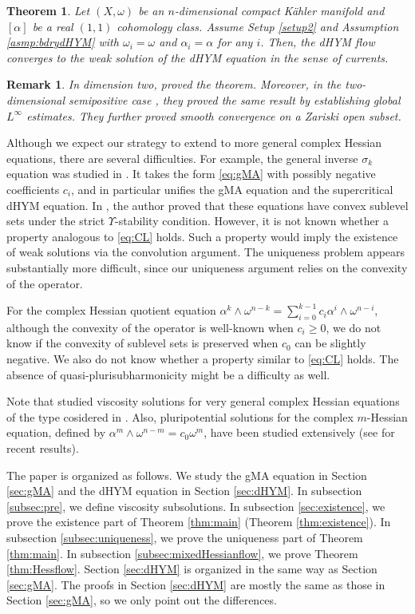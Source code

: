 \documentclass[10pt,a4paper]{amsart}
\numberwithin{equation}{section}
\newtheorem{thm}[equation]{Theorem}
\newtheorem{remark}[equation]{Remark}
\begin{document}
\begin{thm}\label{thm:dHYMflow}
    Let $(X,\omega)$ be an $n$-dimensional compact Kähler manifold and $[\alpha]$ be a real $(1,1)$ cohomology class. Assume Setup \ref{setup2} and Assumption \ref{asmp:bdrydHYM} with $\omega_i=\omega$ and $\alpha_i=\alpha$ for any $i$. 
    Then, the dHYM flow converges to the weak solution of the dHYM equation in the sense of currents.
\end{thm}

\begin{remark}
    In dimension two, \cite{Mur} proved the theorem. Moreover, in the two-dimensional semipositive case \cite{FYZ}, they proved the same result by establishing global $L^\infty$ estimates. They further proved smooth convergence on a Zariski open subset.
\end{remark}

Although we expect our strategy to extend to more general complex Hessian equations, there are several difficulties. 
For example, the general inverse $\sigma_k$ equation was studied in \cite{Lina,Linb}. It takes the form \eqref{eq:gMA} with possibly negative coefficients $c_i$, and in particular unifies the gMA equation and the supercritical dHYM equation. 
In \cite{Lina}, the author proved that these equations have convex sublevel sets under the strict $\Upsilon$-stability condition. However, it is not known whether a property analogous to \eqref{eq:CL} holds. Such a property would imply the existence of weak solutions via the convolution argument. The uniqueness problem appears substantially more difficult, since our uniqueness argument relies on the convexity of the operator.

For the complex Hessian quotient equation $\alpha^k\wedge\omega^{n-k}=\sum_{i=0}^{k-1}c_i\alpha^i\wedge\omega^{n-i}$, although the convexity of the operator is well-known when $c_i\ge0$, we do not know if the convexity of sublevel sets is preserved when $c_0$ can be slightly negative. We also do not know whether a property similar to \eqref{eq:CL} holds. The absence of quasi-plurisubharmonicity might be a difficulty as well. 

Note that \cite{CX25a,CX25b} studied viscosity solutions for very general complex Hessian equations of the type cosidered in \cite{Sze}. Also, pluripotential solutions for the complex $m$-Hessian equation, defined by $\alpha^m\wedge\omega^{n-m}=c_0\omega^m$, have been studied extensively (see \cite{KN,PSWZ} for recent results). 

The paper is organized as follows. We study the gMA equation in Section \ref{sec:gMA} and the dHYM equation in Section \ref{sec:dHYM}. In subsection \ref{subsec:pre}, we define viscosity subsolutions. In subsection \ref{sec:existence}, we prove the existence part of Theorem \ref{thm:main} (Theorem \ref{thm:existence}). In subsection \ref{subsec:uniqueness}, we prove the uniqueness part of Theorem \ref{thm:main}. In subsection \ref{subsec:mixedHessianflow}, we prove Theorem \ref{thm:Hessflow}. Section \ref{sec:dHYM} is organized in the same way as Section \ref{sec:gMA}. The proofs in Section \ref{sec:dHYM} are mostly the same as those in Section \ref{sec:gMA}, so we only point out the differences.
\end{document}
